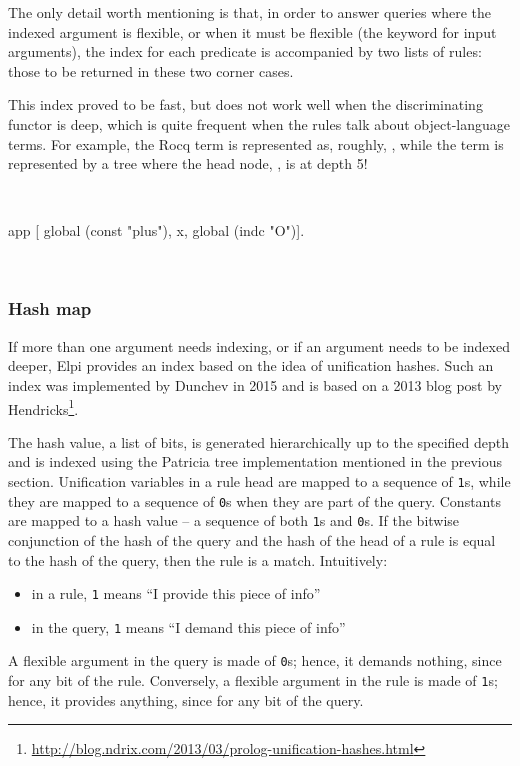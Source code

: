 \documentclass[a4paper, 11pt]{book}
\newenvironment{elpicode}
  {\VerbatimEnvironment~\\\begin{elpibox}\begin{xelpicode}}{\end{xelpicode}
\end{elpibox}\\}
\begin{document}
The only detail worth mentioning is that, in order to answer queries where the
indexed argument is flexible, or when it must be flexible (the 
keyword for input arguments), the index for each predicate is accompanied by
two lists of rules: those to be returned in these two corner cases.


This index proved to be fast, but does not work well when the discriminating
functor is deep, which is quite frequent when the rules talk about object-language
terms. For example, the Rocq term  is represented as, roughly,
, while the term  is represented by a
tree where the head node, , is at depth 5!

\begin{elpicode}
  app [ global (const "plus"), x, global (indc "O")].
\end{elpicode}

\subsubsection{Hash map}


If more than one argument needs indexing, or if an argument needs to be
indexed deeper, Elpi provides an index based on the idea of unification
hashes. Such an index was implemented by Dunchev in 2015 and is based on a
2013 blog post by
Hendricks\footnote{\url{http://blog.ndrix.com/2013/03/prolog-unification-hashes.html}}.


The hash value, a list of bits, is generated hierarchically up to the specified
depth and is indexed using the Patricia tree implementation mentioned in the
previous section. Unification variables in a rule head are mapped to a
sequence of \texttt{1}s, while they are mapped to a sequence of \texttt{0}s
when they are part of the query. Constants are mapped to a hash value -- a
sequence of both \texttt{1}s and \texttt{0}s. If the bitwise conjunction
\ocaml{&} of the hash of the query and the hash of the head of a rule is equal
to the hash of the query, then the rule is a match. Intuitively:
\begin{itemize}
  \item in a rule, \texttt{1} means ``I provide this piece of info''
  \item in the query, \texttt{1} means ``I demand this piece of info''
\end{itemize}


\noindent
A flexible argument in the query is made of \texttt{0}s; hence, it demands
nothing, since  for any bit  of the rule.
Conversely, a flexible argument in the rule is made of \texttt{1}s; hence, it
provides anything, since  for any bit  of the query.
\end{document}
